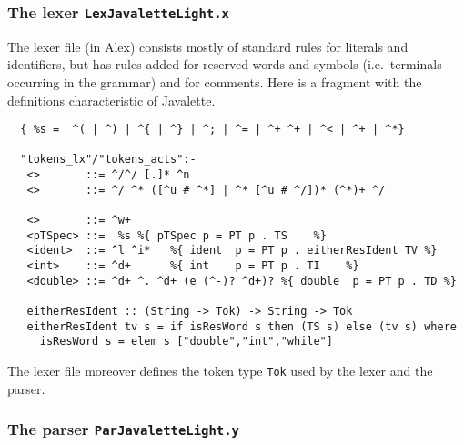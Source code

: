 \documentclass[10pt]{article}
\begin{document}
\subsubsection{The lexer {\tt LexJavaletteLight.x}}

The lexer file (in Alex) consists mostly of standard rules
for literals and identifiers, but has
rules added for reserved words and symbols (i.e.\ terminals 
occurring in the grammar) and for comments. Here is
a fragment with the definitions characteristic of
Javalette.
\small
\begin{verbatim}
  { %s =  ^( | ^) | ^{ | ^} | ^; | ^= | ^+ ^+ | ^< | ^+ | ^*}

  "tokens_lx"/"tokens_acts":-
   <>       ::= ^/^/ [.]* ^n
   <>       ::= ^/ ^* ([^u # ^*] | ^* [^u # ^/])* (^*)+ ^/
 
   <>       ::= ^w+
   <pTSpec> ::=  %s %{ pTSpec p = PT p . TS    %}
   <ident>  ::= ^l ^i*   %{ ident  p = PT p . eitherResIdent TV %}
   <int>    ::= ^d+      %{ int    p = PT p . TI    %}
   <double> ::= ^d+ ^. ^d+ (e (^-)? ^d+)? %{ double  p = PT p . TD %}

   eitherResIdent :: (String -> Tok) -> String -> Tok
   eitherResIdent tv s = if isResWord s then (TS s) else (tv s) where
     isResWord s = elem s ["double","int","while"]
\end{verbatim}
\normalsize
The lexer file moreover defines the token type {\tt Tok} used by
the lexer and the parser.



\subsubsection{The parser {\tt ParJavaletteLight.y}}
\end{document}
